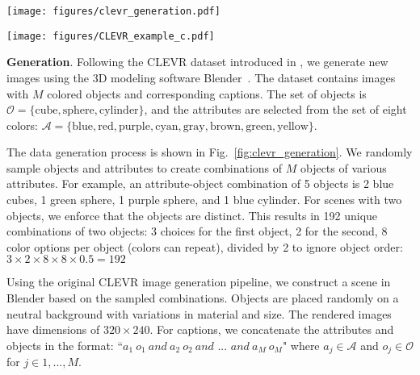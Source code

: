\begin{figure*}[]
  \centering
   \texttt{[image: figures/clevr\_generation.pdf]}
   \caption{\textbf{CLEVR dataset generation process.} From a set of objects and attributes, we randomly generated combinations of $M$ objects per scene. Each combination was rendered with Blender, and a caption was generated by concatenating attributes and objects to match the image.}
   \label{fig:clevr_generation}
\end{figure*}

\begin{figure*}[ht]
  \centering
   \texttt{[image: figures/CLEVR\_example\_c.pdf]}
   \caption{\textbf{Scene complexity increases with more objects.} We show examples from the CLEVR dataset with scenes containing different numbers of objects to highlight how image and text complexity changes with object count.}
   \label{fig:clevr_example}
\end{figure*}

\textbf{Generation}. Following the CLEVR dataset introduced in \cite{Johnson2017}, we generate new images using the 3D modeling software Blender~\cite{blender}. The dataset contains images with $M$ colored objects and corresponding captions. The set of objects is $\mathcal{O} = \{\text{cube}, \text{sphere}, \text{cylinder}\}$, and the attributes are selected from the set of eight colors: $\mathcal{A} = \{\text{blue}, \text{red}, \text{purple}, \text{cyan}, \text{gray}, \text{brown}, \text{green}, \text{yellow}\}$.

The data generation process is shown in Fig.~\ref{fig:clevr_generation}. We randomly sample objects and attributes to create combinations of $M$ objects of various attributes. For example, an attribute-object combination of 5 objects is 2 blue cubes, 1 green sphere, 1 purple sphere, and 1 blue cylinder. For scenes with two objects, we enforce that the objects are distinct. This results in 192 unique combinations of two objects: 3 choices for the first object, 2 for the second, 8 color options per object (colors can repeat), divided by 2 to ignore object order: $3 \times 2 \times 8 \times 8 \times 0.5 = 192$


Using the original CLEVR image generation pipeline, we construct a scene in Blender based on the sampled combinations. Objects are placed randomly on a neutral background with variations in material and size. The rendered images have dimensions of $320 \times 240$. For captions, we concatenate the attributes and objects in the format: ``$a_1 \ o_1 \ \textit{and} \ a_2 \ o_2 \ \textit{and ... and} \ a_M \ o_M$" where $a_j \in \mathcal{A}$ and $o_j \in \mathcal{O}$ for $j \in {1, ..., M}$. 

